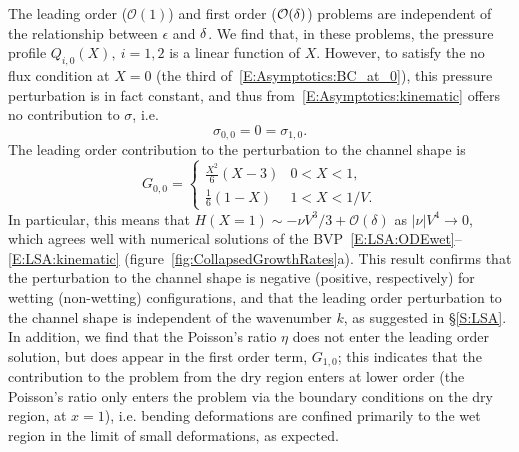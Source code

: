 \documentclass{jfm}
\newcommand{\order}[1]{\mathcal{O}\left(#1\right)}
\newcommand{\poisson}{\eta} %
\begin{document}
The leading order ($\mathcal{O}(1)$) and first order ($\mathcal{O}(\delta)$) problems are independent of the relationship between $\epsilon$ and $\delta$. We find that, in these problems, the pressure profile $Q_{i,0}(X),~i = 1,2$ is a linear function of $X$. However, to satisfy the no flux condition at $X =0$ (the third of~\eqref{E:Asymptotics:BC_at_0}), this pressure perturbation is in fact constant, and thus from~\eqref{E:Asymptotics:kinematic} offers no contribution to $\sigma$, i.e.
\begin{equation}
\sigma_{0,0} = 0 = \sigma_{1,0}.
\end{equation}
The leading order contribution to the perturbation to the channel shape is
\begin{equation}\label{E:Asymptotics:ChannelShapeSolution}
G_{0,0} =\begin{cases}
\frac{X^2}{6}(X - 3) & 0 < X < 1,\\
\frac{1}{6}(1-X) & 1 < X < 1/V.
\end{cases}
\end{equation}
In particular, this means that $H(X=1) \sim -\nu V^3/3 + \order{\delta}$ as $|\nu| V^4 \to 0$, which agrees well with numerical solutions of the BVP~\eqref{E:LSA:ODEwet}--\eqref{E:LSA:kinematic} (figure~\ref{fig:CollapsedGrowthRates}a). This result confirms that the perturbation to the channel shape is negative (positive, respectively) for wetting (non-wetting) configurations, and that the leading order perturbation to the channel shape is independent of the wavenumber $k$, as suggested in \S\ref{S:LSA}. In addition, we find that the Poisson's ratio $\poisson$ does not enter the leading order solution, but does appear in the first order term, $G_{1,0}$; this indicates that the contribution to the problem from the dry region enters at lower order (the Poisson's ratio only enters the problem via the boundary conditions on the dry region, at $x = 1$), i.e. bending deformations are confined primarily to the wet region in the limit of small deformations, as expected.
\end{document}
